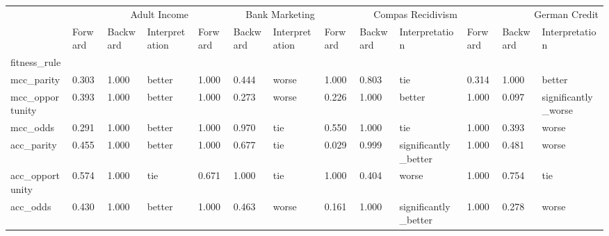 \begin{tabular}{lllllllllllll}
\toprule
 & \multicolumn{3}{r}{Adult Income} & \multicolumn{3}{r}{Bank Marketing} & \multicolumn{3}{r}{Compas Recidivism} & \multicolumn{3}{r}{German Credit} \\
 & Forward & Backward & Interpretation & Forward & Backward & Interpretation & Forward & Backward & Interpretation & Forward & Backward & Interpretation \\
fitness_rule &  &  &  &  &  &  &  &  &  &  &  &  \\
\midrule
mcc_parity & 0.303 & 1.000 & better & 1.000 & 0.444 & worse & 1.000 & 0.803 & tie & 0.314 & 1.000 & better \\
mcc_opportunity & 0.393 & 1.000 & better & 1.000 & 0.273 & worse & 0.226 & 1.000 & better & 1.000 & 0.097 & significantly_worse \\
mcc_odds & 0.291 & 1.000 & better & 1.000 & 0.970 & tie & 0.550 & 1.000 & tie & 1.000 & 0.393 & worse \\
acc_parity & 0.455 & 1.000 & better & 1.000 & 0.677 & tie & 0.029 & 0.999 & significantly_better & 1.000 & 0.481 & worse \\
acc_opportunity & 0.574 & 1.000 & tie & 0.671 & 1.000 & tie & 1.000 & 0.404 & worse & 1.000 & 0.754 & tie \\
acc_odds & 0.430 & 1.000 & better & 1.000 & 0.463 & worse & 0.161 & 1.000 & significantly_better & 1.000 & 0.278 & worse \\
\bottomrule
\end{tabular}
